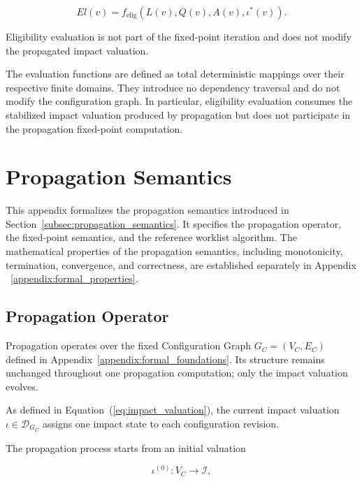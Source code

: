 \documentclass[10pt]{article}
\begin{document}
\begin{equation}
	El(v)
	=
	f_{\mathrm{elig}}
	\left(
	L(v),
	Q(v),
	A(v),
	\iota^{*}(v)
	\right).
	\label{eq:eligibility_from_fixed_impact}
\end{equation}

Eligibility evaluation is not part of the fixed-point iteration and does not modify the propagated impact valuation.

The evaluation functions are defined as total deterministic mappings over their respective finite domains. They introduce no dependency traversal and do not modify the configuration graph. In particular, eligibility evaluation consumes the stabilized impact valuation produced by propagation but does not participate in the propagation fixed-point computation.

\section{Propagation Semantics}
\label{appendix:propagation_semantics}

This appendix formalizes the propagation semantics introduced in
Section~\ref{subsec:propagation_semantics}. It specifies the propagation operator, the fixed-point semantics, and the reference worklist algorithm.
The mathematical properties of the propagation semantics, including monotonicity, termination, convergence, and correctness, are established separately in Appendix ~\ref{appendix:formal_properties}.

\subsection{Propagation Operator}

Propagation operates over the fixed Configuration Graph
$G_C=(V_C,E_C)$ defined in Appendix~\ref{appendix:formal_foundations}.
Its structure remains unchanged throughout one propagation computation; only the impact valuation evolves.

As defined in Equation~(\ref{eq:impact_valuation}), the current impact valuation $\iota\in\mathcal D_{G_C}$ assigns one impact state to each configuration revision.

The propagation process starts from an initial valuation

\begin{equation}
	\iota^{(0)} : V_C \rightarrow \mathcal{I},
	\label{eq:initial_impact_valuation}
\end{equation}
\end{document}
